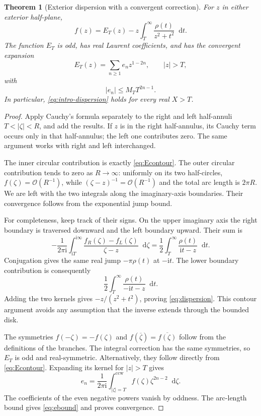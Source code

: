 \documentclass[11pt,a4paper]{article}
\newtheorem{theorem}{Theorem}[section]
\theoremstyle{definition}
\numberwithin{equation}{section}
\newcommand{\dd}{\mathop{}\!\mathrm{d}}
\newcommand{\ii}{\mathrm{i}}
\newcommand{\Oh}{\mathcal O}
\begin{document}
\begin{theorem}[Exterior dispersion with a convergent correction]
\label{thm:dispersion}
For $z$ in either exterior half-plane,
\begin{equation}
 f(z)=E_T(z)-z\int_T^\infty\frac{\rho(t)}{z^2+t^2}\dd t.
 \label{eq:dispersion}
\end{equation}
The function $E_T$ is odd, has real Laurent coefficients, and has the
convergent expansion
\begin{equation}
 E_T(z)=\sum_{n\ge1}e_nz^{1-2n},\qquad |z|>T,
 \label{eq:Elau}
\end{equation}
with
\begin{equation}
 |e_n|\le M_TT^{2n-1}.
 \label{eq:ebound}
\end{equation}
In particular, \eqref{eq:intro-dispersion} holds for every real $X>T$.
\end{theorem}
\begin{proof}
Apply Cauchy's formula separately to the right and left half-annuli
$T<|\zeta|<R$, and add the results. If $z$ is in the right half-annulus,
its Cauchy term occurs only in that half-annulus; the left one contributes
zero. The same argument works with right and left interchanged.

The inner circular contribution is exactly \eqref{eq:Econtour}. The outer
circular contribution tends to zero as $R\to\infty$: uniformly on its two
half-circles, $f(\zeta)=\Oh(R^{-1})$, while
$(\zeta-z)^{-1}=\Oh(R^{-1})$ and the total arc length is $2\pi R$.
We are left with the two integrals along the imaginary-axis boundaries.
Their convergence follows from the exponential jump bound.

For completeness, keep track of their signs. On the upper imaginary
axis the right boundary is traversed downward and the left boundary
upward. Their sum is
\[
 -\frac1{2\pi\ii}\int_{\ii T}^{\ii\infty}
          \frac{f_R(\zeta)-f_L(\zeta)}{\zeta-z}\dd\zeta
   =\frac12\int_T^\infty\frac{\rho(t)}{\ii t-z}\dd t.
\]
Conjugation gives the same real jump $-\pi\rho(t)$ at $-\ii t$.
The lower boundary contribution is consequently
\[
 \frac12\int_T^\infty\frac{\rho(t)}{-\ii t-z}\dd t.
\]
Adding the two kernels gives $-z/(z^2+t^2)$, proving
\eqref{eq:dispersion}. This contour argument avoids any assumption that
the inverse extends through the bounded disk.

The symmetries $f(-\zeta)=-f(\zeta)$ and
$f(\overline\zeta)=\overline{f(\zeta)}$ follow from the definitions of the
branches. The integral correction has the same symmetries, so $E_T$ is
odd and real-symmetric. Alternatively, they follow directly from
\eqref{eq:Econtour}. Expanding its kernel for $|z|>T$ gives
\[
 e_n=\frac1{2\pi\ii}\int_{|\zeta|=T}^{\mathrm{ccw}}
                  f(\zeta)\zeta^{2n-2}\dd\zeta.
\]
The coefficients of the even negative powers vanish by oddness.
The arc-length bound gives \eqref{eq:ebound} and proves convergence.
\end{proof}
\end{document}
